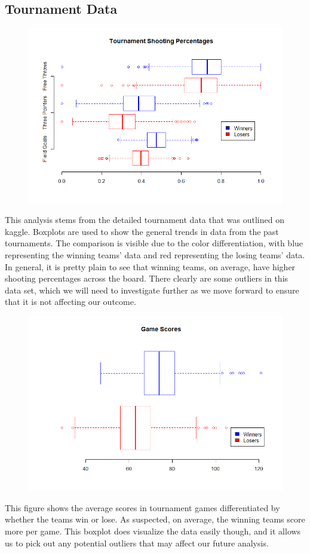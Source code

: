 \documentclass[]{scrartcl}
\begin{document}
\subsection*{Tournament Data}
\begin{figure}[H]
	\centering
	\includegraphics[scale=.6]{TourneyShotPercent.png}
\end{figure}
This analysis stems from the detailed tournament data that was outlined on kaggle. Boxplots are used to show the general trends in data from the past tournaments. The comparison is visible due to the color differentiation, with blue representing the winning teams' data and red representing the losing teams' data. In general, it is pretty plain to see that winning teams, on average, have higher shooting percentages across the board. There clearly are some outliers in this data set, which we will need to investigate further as we move forward to ensure that it is not affecting our outcome.
\begin{figure}[H]
	\centering
	\includegraphics[scale=.6]{GameScores.png}
\end{figure}
This figure shows the average scores in tournament games differentiated by whether the teams win or lose. As suspected, on average, the winning teams score more per game. This boxplot does visualize the data easily though, and it allows us to pick out any potential outliers that may affect our future analysis.
\end{document}
